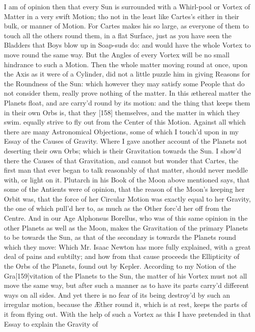 \documentclass[letterpaper]{book}
\begin{document}
I am of opinion then that every Sun is surrounded with a Whirl-pool or
Vortex of Matter in a very swift Motion; tho not in the least like Cartes's
either in their bulk, or manner of Motion. For Cartes makes his so large,
as everyone of them to touch all the others round them, in a flat Surface,
just as you have seen the Bladders that Boys blow up in Soap-suds do: and
would have the whole Vortex to move round the same way. But the Angles
of every Vortex will be no small hindrance to such a Motion. Then the whole
matter moving round at once, upon the Axis as it were of a Cylinder, did not
a little puzzle him in giving Reasons for the Roundness of the Sun: which
however they may satisfy some People that do not consider them, really
prove nothing of the matter. In this æthereal matter the Planets float, and
are carry'd round by its motion: and the thing that keeps them in their own
Orbs is, that they [158] themselves, and the matter in which they swim.
equally strive to fly out from the Center of this Motion. Against all which
there are many Astronomical Objections, some of which I touch'd upon in
my Essay of the Causes of Gravity. Where I gave another account of the
Planets not deserting their own Orbs; which is their Gravitation towards
the Sun. I show'd there the Causes of that Gravitation, and cannot but
wonder that Cartes, the first man that ever began to talk reasonably of that
matter, should never meddle with, or light on it. Plutarch in his Book of
the Moon above mentioned says, that some of the Antients were of opinion,
that the reason of the Moon's keeping her Orbit was, that the force of her
Circular Motion was exactly equal to her Gravity, the one of which pull'd
her to, as much as the Other forc'd her off from the Centre. And in our
Age Alphonsus Borellus, who was of this same opinion in the other Planets
as well as the Moon, makes the Gravitation of the primary Planets to be
towards the Sun, as that of the secondary is towards the Planets round
which they move: Which Mr. Isaac Newton has more fully explained, with
a great deal of pains and subtilty; and how from that cause proceeds the
Ellipticity of the Orbs of the Planets, found out by Kepler. According to
my Notion of the Gra[159]vitation of the Planets to the Sun, the matter of
his Vortex must not all move the same way, but after such a manner as to
have its parts carry'd different ways on all sides. And yet there is no fear of
its being destroy'd by such an irregular motion, because the Æther round it,
which is at rest, keeps the parts of it from flying out. With the help of such
a Vortex as this I have pretended in that Essay to explain the Gravity of
\end{document}
